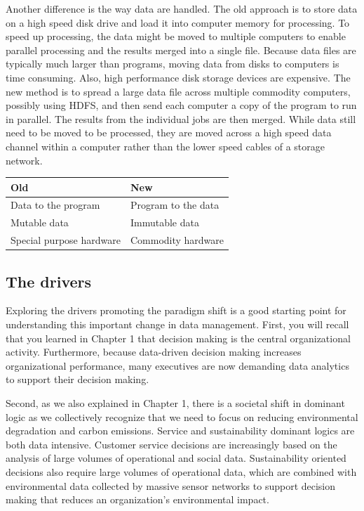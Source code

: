 \documentclass[
]{article}
\begin{document}
Another difference is the way data are handled. The old approach is to
store data on a high speed disk drive and load it into computer memory
for processing. To speed up processing, the data might be moved to
multiple computers to enable parallel processing and the results merged
into a single file. Because data files are typically much larger than
programs, moving data from disks to computers is time consuming. Also,
high performance disk storage devices are expensive. The new method is
to spread a large data file across multiple commodity computers,
possibly using HDFS, and then send each computer a copy of the program
to run in parallel. The results from the individual jobs are then
merged. While data still need to be moved to be processed, they are
moved across a high speed data channel within a computer rather than the
lower speed cables of a storage network.

\begin{longtable}[]{@{}ll@{}}
\toprule
Old & New \\
\midrule
\endhead
Data to the program & Program to the data \\
Mutable data & Immutable data \\
Special purpose hardware & Commodity hardware \\
\bottomrule
\end{longtable}

\hypertarget{the-drivers}{%
\subsection*{The drivers}\label{the-drivers}}

Exploring the drivers promoting the paradigm shift is a good starting
point for understanding this important change in data management. First,
you will recall that you learned in Chapter 1 that decision making is
the central organizational activity. Furthermore, because data-driven
decision making increases organizational performance, many executives
are now demanding data analytics to support their decision making.

Second, as we also explained in Chapter 1, there is a societal shift in
dominant logic as we collectively recognize that we need to focus on
reducing environmental degradation and carbon emissions. Service and
sustainability dominant logics are both data intensive. Customer service
decisions are increasingly based on the analysis of large volumes of
operational and social data. Sustainability oriented decisions also
require large volumes of operational data, which are combined with
environmental data collected by massive sensor networks to support
decision making that reduces an organization's environmental impact.
\end{document}
